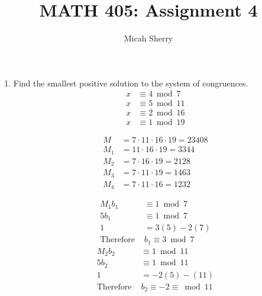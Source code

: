 \documentclass{article}
\title{MATH 405: Assignment 4}
\author{Micah Sherry}
\begin{document}
	\maketitle
	\begin{enumerate}
		\item Find the smallest positive solution to the system of congruences.
		\begin{align*}
			x &\equiv 4 \bmod{7}\\
			x &\equiv 5 \bmod{11}\\
			x &\equiv 2 \bmod{16}\\
			x &\equiv 1 \bmod{19}
		\end{align*}
		
		
		\begin{align*}
			M   &= 7  \cdot 11 \cdot 16 \cdot 19 = 23408\\
			M_1 &= 11 \cdot 16 \cdot 19 = 3344\\
			M_2 &= 7  \cdot 16 \cdot 19 = 2128\\
			M_3 &= 7  \cdot 11 \cdot 19 = 1463\\
			M_4 &= 7  \cdot 11 \cdot 16 = 1232
		\end{align*}
		
		\begin{multicols}{2}	
			\begin{align*}
				M_1b_1 &\equiv1 \bmod{7}\\
				5b_1 &\equiv1 \bmod{7}\\
				1  &= 3(5)-2(7)\\
				\text{Therefore } & b_1 \equiv 3\bmod{7}
			\end{align*}
			\begin{align*}
				M_2b_2 &\equiv1 \bmod{11}\\
				5b_2 &\equiv1 \bmod{11}\\
				1  &= -2(5)-(11)\\
			\text{Therefore } & b_2\equiv-2 \equiv \bmod{11}
			\end{align*}
			

\end{multicols}
\end{enumerate}
\end{document}
